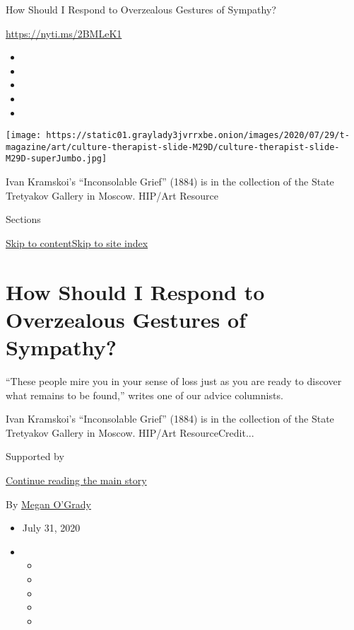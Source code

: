 How Should I Respond to Overzealous Gestures of Sympathy?

\url{https://nyti.ms/2BMLeK1}

\begin{itemize}
\item
\item
\item
\item
\item
\end{itemize}

\texttt{[image: https://static01.graylady3jvrrxbe.onion/images/2020/07/29/t-magazine/art/culture-therapist-slide-M29D/culture-therapist-slide-M29D-superJumbo.jpg]}

Ivan Kramskoi's ``Inconsolable Grief'' (1884) is in the collection of
the State Tretyakov Gallery in Moscow. HIP/Art Resource

Sections

\protect\hyperlink{site-content}{Skip to
content}\protect\hyperlink{site-index}{Skip to site index}

\hypertarget{how-should-i-respond-to-overzealous-gestures-of-sympathy}{%
\section{How Should I Respond to Overzealous Gestures of
Sympathy?}\label{how-should-i-respond-to-overzealous-gestures-of-sympathy}}

``These people mire you in your sense of loss just as you are ready to
discover what remains to be found,'' writes one of our advice
columnists.

Ivan Kramskoi's ``Inconsolable Grief'' (1884) is in the collection of
the State Tretyakov Gallery in Moscow. HIP/Art ResourceCredit...

Supported by

\protect\hyperlink{after-sponsor}{Continue reading the main story}

By \href{https://www.nytimes3xbfgragh.onion/by/megan-o-grady}{Megan
O'Grady}

\begin{itemize}
\item
  July 31, 2020
\item
  \begin{itemize}
  \item
  \item
  \item
  \item
  \item
  \end{itemize}
\end{itemize}

